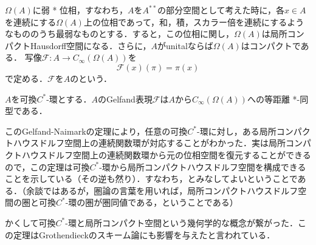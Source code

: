 $\Omega(A)$に弱 * 位相，すなわち，$A$を$A^{**}$の部分空間として考えた時に，各$x\in A$を連続にする$\Omega(A)$上の位相であって，和，積，スカラー倍を連続にするようなもののうち最弱なものとする．すると，この位相に関し，$\Omega(A)$は局所コンパクトHausdorff空間になる．さらに，$A$がunitalならば$\Omega(A)$はコンパクトである．
写像$\mathscr{F}:A \rightarrow C_{\infty}(\Omega(A))$を
\[\mathscr{F}(x)(\pi)=\pi(x)\]
で定める．$\mathscr{F}$を$A$のという．
\begin{theo}
$A$を可換$C^*$-環とする．$A$の{\rm Gelfand}表現$\mathscr{F}$は$A$から$C_{\infty}(\Omega(A))$への等距離 *-同型である．
\end{theo}
このGelfand-Naimarkの定理により，任意の可換$C^*$-環に対し，ある局所コンパクトハウスドルフ空間上の連続関数環が対応することがわかった．実は局所コンパクトハウスドルフ空間上の連続関数環から元の位相空間を復元することができるので，この定理は可換$C^*$-環から局所コンパクトハウスドルフ空間を構成できることを示している（その逆も然り）．すなわち，とみなしてよいということである．（余談ではあるが，圏論の言葉を用いれば，局所コンパクトハウスドルフ空間の圏と可換$C^*$-環の圏が圏同値である，ということである）

かくして可換$C^*$-環と局所コンパクト空間という幾何学的な概念が繋がった．この定理はGrothendieckのスキーム論にも影響を与えたと言われている．

